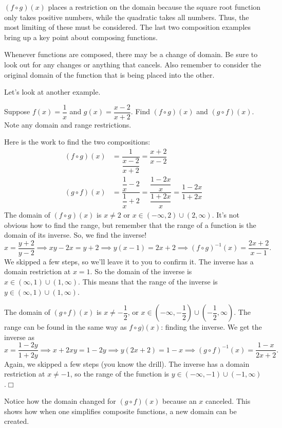 \documentclass[lang=en,11pt]{elegantbook}
\begin{document}
$(f\circ g)(x)$ places a restriction on the domain because the square root function only takes positive numbers, while the quadratic takes all numbers.  Thus, the most limiting of these must be considered.  The last two composition examples bring up a key point about composing functions.  
\begin{note}
Whenever functions are composed, there may be a change of domain.  Be sure to look out for any changes or anything that cancels.  Also remember to consider the original domain of the function that is being placed into the other.
\end{note}
Let's look at another example.
\begin{example}
Suppose $f(x)=\dfrac{1}{x}$ and $g(x)=\dfrac{x-2}{x+2}$.  Find $(f\circ g)(x)$ and $(g\circ f)(x)$.  Note any domain and range restrictions.
\end{example}
\begin{solution}
Here is the work to find the two compositions:\begin{align*}
    (f\circ g)(x)&=\dfrac{1}{\dfrac{x-2}{x+2}}=\dfrac{x+2}{x-2} \\
    (g\circ f)(x)&=\dfrac{\dfrac{1}{x}-2}{\dfrac{1}{x}+2}=\dfrac{\dfrac{1-2x}{x}}{\dfrac{1+2x}{x}}=\dfrac{1-2x}{1+2x}
\end{align*}
The domain of $(f\circ g)(x)$ is $x\neq 2$ or $x\in(-\infty,2)\cup(2,\infty)$.  It's not obvious how to find the range, but remember that the range of a function is the domain of its inverse.  So, we find the inverse! $$x=\dfrac{y+2}{y-2} \implies xy-2x=y+2\implies y(x-1)=2x+2 \implies (f\circ g)^{-1}(x)=\dfrac{2x+2}{x-1}.$$  We skipped a few steps, so we'll leave it to you to confirm it.  The inverse has a domain restriction at $x=1$.  So the domain of the inverse is $x\in(\infty,1)\cup(1,\infty)$.  This means that the range of the inverse is $y\in(\infty,1)\cup(1,\infty)$.

The domain of $(g\circ f)(x)$ is $x\neq-\dfrac{1}{2}$, or $x\in\left(-\infty,-\dfrac{1}{2}\right)\cup\left(-\dfrac{1}{2},\infty\right)$.  The range can be found in the same way as $f\circ g)(x)$: finding the inverse.  We get the inverse as $$x=\dfrac{1-2y}{1+2y}\implies x+2xy=1-2y\implies y(2x+2)=1-x \implies (g\circ f)^{-1}(x)=\dfrac{1-x}{2x+2}.$$  Again, we skipped a few steps (you know the drill).  The inverse has a domain restriction at $x\neq -1$, so the range of the function is $y\in(-\infty,-1)\cup(-1,\infty)$.$\Box$
\end{solution}
Notice how the domain changed for $(g\circ f)(x)$ because an $x$ canceled.  This shows how when one simplifies composite functions, a new domain can be created.  
\end{document}
